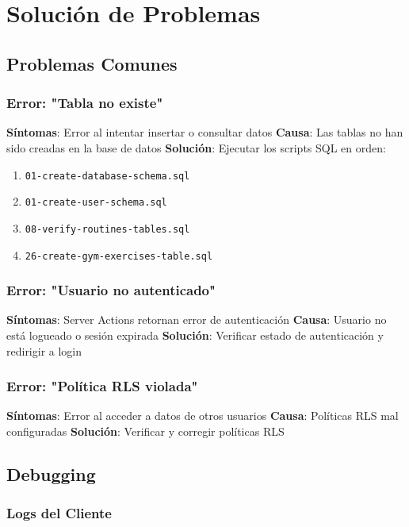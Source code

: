 \documentclass[12pt,a4paper]{article}
\begin{document}
\section{Solución de Problemas}

\subsection{Problemas Comunes}

\subsubsection{Error: "Tabla no existe"}

\textbf{Síntomas}: Error al intentar insertar o consultar datos
\textbf{Causa}: Las tablas no han sido creadas en la base de datos
\textbf{Solución}: Ejecutar los scripts SQL en orden:
\begin{enumerate}
    \item \texttt{01-create-database-schema.sql}
    \item \texttt{01-create-user-schema.sql}
    \item \texttt{08-verify-routines-tables.sql}
    \item \texttt{26-create-gym-exercises-table.sql}
\end{enumerate}

\subsubsection{Error: "Usuario no autenticado"}

\textbf{Síntomas}: Server Actions retornan error de autenticación
\textbf{Causa}: Usuario no está logueado o sesión expirada
\textbf{Solución}: Verificar estado de autenticación y redirigir a login

\subsubsection{Error: "Política RLS violada"}

\textbf{Síntomas}: Error al acceder a datos de otros usuarios
\textbf{Causa}: Políticas RLS mal configuradas
\textbf{Solución}: Verificar y corregir políticas RLS

\subsection{Debugging}

\subsubsection{Logs del Cliente}
\end{document}
